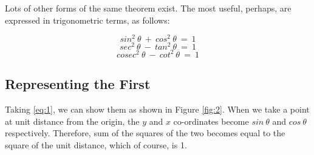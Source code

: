 Lots of other forms of the same theorem exist. The most useful, perhaps, are
expressed in trigonometric terms, as follows:

\begin{equation}\label{eq:1}
    sin^2~\theta ~+~ cos^2~\theta ~=~ 1
\end{equation}
\begin{equation}
    sec^2~\theta ~-~ tan^2~\theta ~=~ 1
    \label{eq:2}
\end{equation}
\begin{equation}
    cosec^2~\theta ~-~ cot^2~\theta ~=~ 1
    \label{eq:3}
\end{equation}

\subsection{Representing the First}
Taking \ref{eq:1}, we can show them as shown in Figure \ref{fig:2}. When we take a point at
unit distance from the origin, the $y$ and $x$ co-ordinates become $sin~\theta$ and $cos~\theta$
respectively. Therefore, sum of the squares of the two becomes equal to the
square of the unit distance, which of course, is 1.
